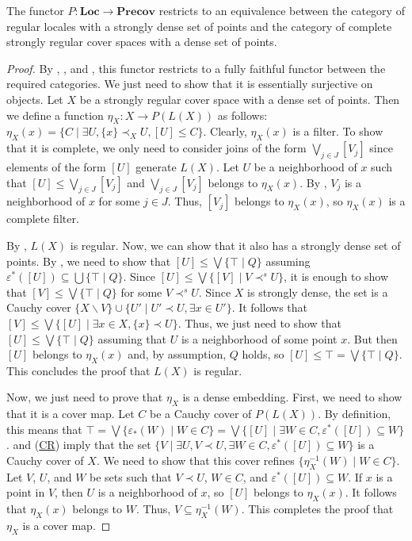 \documentclass[reqno]{amsart}
\newcommand{\axref}[1]{(\hyperref[ax:#1]{#1})}
\theoremstyle{definition}
\theoremstyle{remark}
\numberwithin{figure}{section}
\newcommand{\rb}{\prec}
\newcommand{\cat}[1]{\mathbf{#1}}
\begin{document}
\begin{thm}
The functor $P : \cat{Loc} \to \cat{Precov}$ restricts to an equivalence between the category of regular locales with a strongly dense set of points and the category of complete strongly regular cover spaces with a dense set of points.
\end{thm}
\begin{proof}
By , , and , this functor restricts to a fully faithful functor between the required categories.
We just need to show that it is essentially surjective on objects.
Let $X$ be a strongly regular cover space with a dense set of points.
Then we define a function $\eta_X : X \to P(L(X))$ as follows: $\eta_X(x) = \{ C \mid \exists U, \{ x \} \rb_X U, [U] \leq C \}$.
Clearly, $\eta_X(x)$ is a filter.
To show that it is complete, we only need to consider joins of the form $\bigvee_{j \in J} [V_j]$ since elements of the form $[U]$ generate $L(X)$.
Let $U$ be a neighborhood of $x$ such that $[U] \leq \bigvee_{j \in J} [V_j]$ and $\bigvee_{j \in J} [V_j]$ belongs to $\eta_X(x)$.
By , $V_j$ is a neighborhood of $x$ for some $j \in J$.
Thus, $[V_j]$ belongs to $\eta_X(x)$, so $\eta_X(x)$ is a complete filter.

By , $L(X)$ is regular.
Now, we can show that it also has a strongly dense set of points.
By , we need to show that $[U] \leq \bigvee \{ \top \mid Q \}$ assuming $\varepsilon^*([U]) \subseteq \bigcup \{ \top \mid Q \}$.
Since $[U] \leq \bigvee \{ [V] \mid V \rb^s U \}$, it is enough to show that $[V] \leq \bigvee \{ \top \mid Q \}$ for some $V \rb^s U$.
Since $X$ is strongly dense, the set is a Cauchy cover $\{ X \backslash V \} \cup \{ U' \mid U' \rb U, \exists x \in U' \}$.
It follows that $[V] \leq \bigvee \{ [U] \mid \exists x \in X, \{ x \} \rb U \}$.
Thus, we just need to show that $[U] \leq \bigvee \{ \top \mid Q \}$ assuming that $U$ is a neighborhood of some point $x$.
But then $[U]$ belongs to $\eta_X(x)$ and, by assumption, $Q$ holds, so $[U] \leq \top = \bigvee \{ \top \mid Q \}$.
This concludes the proof that $L(X)$ is regular.

Now, we just need to prove that $\eta_X$ is a dense embedding.
First, we need to show that it is a cover map.
Let $C$ be a Cauchy cover of $P(L(X))$.
By definition, this means that $\top = \bigvee \{ \varepsilon_*(W) \mid W \in C \} = \bigvee \{ [U] \mid \exists W \in C, \varepsilon^*([U]) \subseteq W \}$.
 and \axref{CR} imply that the set $\{ V \mid \exists U, V \rb U, \exists W \in C, \varepsilon^*([U]) \subseteq W \}$ is a Cauchy cover of $X$.
We need to show that this cover refines $\{ \eta_X^{-1}(W) \mid W \in C \}$.
Let $V$, $U$, and $W$ be sets such that $V \rb U$, $W \in C$, and $\varepsilon^*([U]) \subseteq W$.
If $x$ is a point in $V$, then $U$ is a neighborhood of $x$, so $[U]$ belongs to $\eta_X(x)$.
It follows that $\eta_X(x)$ belongs to $W$.
Thus, $V \subseteq \eta_X^{-1}(W)$.
This completes the proof that $\eta_X$ is a cover map.


\end{proof}
\end{document}
